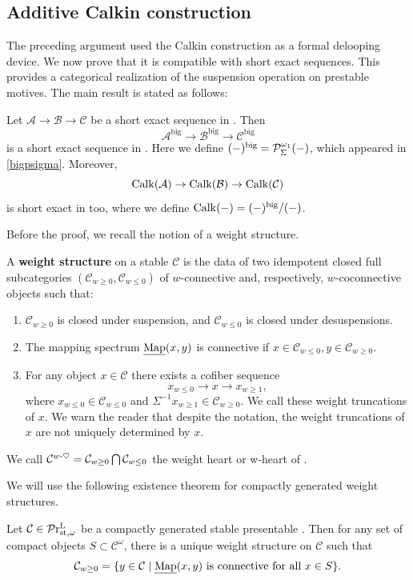 \documentclass[a4paper,10pt, oneside]{amsart}
\begin{document}
\subsection{Additive Calkin construction}
The preceding argument used the Calkin construction as a formal delooping
device.  We now  prove that it is compatible with short exact sequences.  This provides a
categorical realization of the suspension operation on prestable motives.
 The main result is stated as follows:
\begin{thm}\label{addcalk}
	Let
	$	\mathcal{A} \longrightarrow \mathcal{B} \longrightarrow \mathcal{C}$	be a short exact sequence in \catadidem. Then
	\[
	\mathcal{A}^{\mathrm{big}} \longrightarrow \mathcal{B}^{\mathrm{big}} \longrightarrow \mathcal{C}^{\mathrm{big}}
	\]
	is a short exact sequence in \catadidem. Here we define $(-)^{\mathrm{big}}=\mathcal{P}_{\Sigma}^{\omega_1}(-)$, which appeared in \cref{bigpsigma}.
	Moreover, $$\mathrm{Calk}(\mathcal{A})\to\mathrm{Calk}(\mathcal{B})\to\mathrm{Calk}(\mathcal{C})$$ is short exact in \catadidem too, %
	where we define $\mathrm{Calk}(-)=(-)^{\mathrm{big}}/(-)$.%
\end{thm}
Before the proof, we recall the notion of a weight structure.
\begin{de}\label{wstructure}
	A \textbf{weight structure} on a stable \infcat $\mathcal{C}$ is the data of two idempotent closed full subcategories $\left(\mathcal{C}_{w \geq 0}, \mathcal{C}_{w \leq 0}\right)$ of $w$-connective and, respectively, $w$-coconnective objects such that:
	\begin{enumerate}
	\item $\mathcal{C}_{w \geq 0}$ is closed under suspension, and $\mathcal{C}_{w \leq 0}$ is closed under desuspensions.
	\item  The mapping spectrum $\underline{\operatorname{Map}}(x, y)$ is connective if $x \in \mathcal{C}_{w \leq 0}, y \in \mathcal{C}_{w \geq 0}$.
	\item For any object $x \in \mathcal{C}$ there exists a cofiber sequence
	$$
	x_{w\leq 0} \rightarrow x \rightarrow x_{w\geq 1},
	$$
	where $x_{w\leq 0} \in \mathcal{C}_{w \leq 0}$ and $\Sigma^{-1} x_{w\geq 1} \in \mathcal{C}_{w \geq 0}$. We call these weight truncations of $x$.
	We warn the reader that despite the notation, the weight truncations of $x$ are not uniquely determined by $x$.
	\end{enumerate}
	We call $\mathcal{C}^{w\text{-}\heartsuit}=\mathcal{C}_{w \geq 0}\bigcap \mathcal{C}_{w \leq 0}$ the weight heart or w-heart of \mcc.
\end{de}
We will use the following existence theorem for compactly generated weight
structures.  
\begin{thm}\label{cgwstructure}
 Let $\mathcal{C}\in \mathcal{P}\mathrm{r}^\mathrm{L}_{\mathrm{st},\omega}$ be a compactly generated stable presentable \infcat. Then for any set of compact objects $S \subset \mathcal{C}^\omega$, there is a unique weight structure on $\mathcal{C}$ such that
$$
\mathcal{C}_{w \geq 0}=\{y \in \mathcal{C}\mid \underline{\operatorname{Map}}(x, y) \text{ is connective for all } x \in S\}.
$$

\end{thm}
\end{document}
